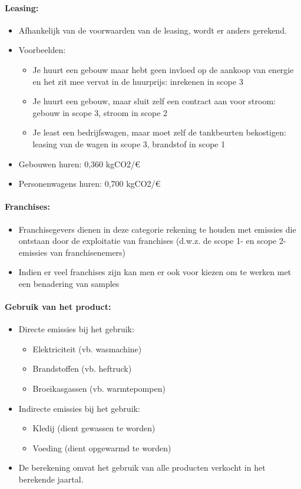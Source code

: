\documentclass[12pt]{article}
\begin{document}
\paragraph{Leasing:}
\begin{itemize}
    \item Afhankelijk van de voorwaarden van de leasing, wordt er
    anders gerekend.
    \item Voorbeelden:\begin{itemize}
        \item Je huurt een gebouw maar hebt geen invloed op de
        aankoop van energie en het zit mee vervat in de
        huurprijs: inrekenen in scope 3
        \item Je huurt een gebouw, maar sluit zelf een contract aan
        voor stroom: gebouw in scope 3, stroom in scope 2
        \item Je least een bedrijfswagen, maar moet zelf de
        tankbeurten bekostigen: leasing van de wagen in scope
        3, brandstof in scope 1
    \end{itemize}
    \item Gebouwen huren: 0,360 kgCO2/€
    \item Personenwagens huren: 0,700 kgCO2/€
\end{itemize}
\paragraph{Franchises:}
\begin{itemize}
    \item Franchisegevers dienen in deze categorie rekening te houden met emissies die
    ontstaan door de exploitatie van franchises (d.w.z. de scope 1- en scope 2-emissies
    van franchisenemers) 
    \item Indien er veel franchises zijn kan men er ook
    voor kiezen om te werken met een benadering
    van samples
\end{itemize}
\paragraph{Gebruik van het product:}
\begin{itemize}
    \item Directe emissies bij het gebruik:\begin{itemize}
        \item Elektriciteit (vb. wasmachine) 
        \item Brandstoffen (vb. heftruck) 
        \item Broeikasgassen (vb. warmtepompen)
    \end{itemize}
    \item Indirecte emissies bij het gebruik:\begin{itemize}
        \item Kledij (dient gewassen te worden) 
        \item Voeding (dient opgewarmd te worden)
    \end{itemize}
    \item De berekening omvat het gebruik van alle producten verkocht in het berekende jaartal.
\end{itemize}
\end{document}
